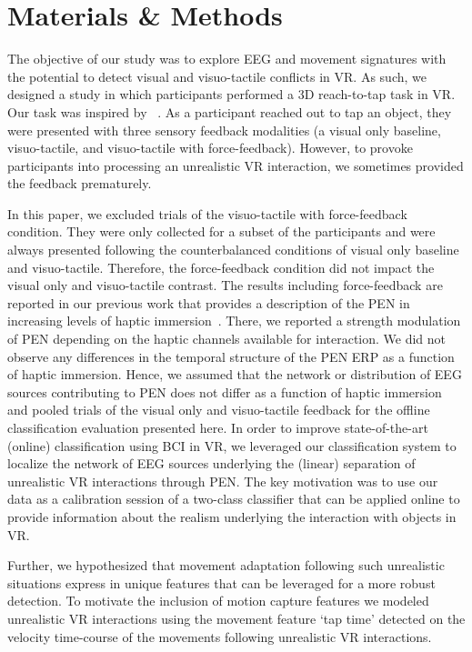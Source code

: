 \section{Materials \& Methods}
The objective of our study was to explore EEG and movement signatures with the potential to detect visual and visuo-tactile conflicts in VR. As such, we designed a study in which participants performed a 3D reach-to-tap task in VR. Our task was inspired by ~\cite{Singh2018-qi}. As a participant reached out to tap an object, they were presented with three sensory feedback modalities (a visual only baseline, visuo-tactile, and visuo-tactile with force-feedback). However, to provoke participants into processing an unrealistic VR interaction, we sometimes provided the feedback prematurely.

In this paper, we excluded trials of the visuo-tactile with force-feedback condition. They were only collected for a subset of the participants and were always presented following the counterbalanced conditions of visual only baseline and visuo-tactile. Therefore, the force-feedback condition did not impact the visual only and visuo-tactile contrast. The results including force-feedback are reported in our previous work that provides a description of the PEN in increasing levels of haptic immersion~\cite{Gehrke2019-og}. \textcolor{n}{There, we reported a strength modulation of PEN depending on the haptic channels available for interaction. We did not observe any differences in the temporal structure of the PEN ERP as a function of haptic immersion. Hence, we assumed that the network or distribution of EEG sources contributing to PEN does not differ as a function of haptic immersion and pooled trials of the visual only and visuo-tactile feedback for the offline classification evaluation presented here. In order to improve state-of-the-art (online) classification using BCI in VR, we leveraged our classification system to localize the network of EEG sources underlying the (linear) separation of unrealistic VR interactions through PEN. The key motivation was to use our data as a calibration session of a two-class classifier that can be applied online to provide information about the realism underlying the interaction with objects in VR.}

\textcolor{n}{Further, we hypothesized that movement adaptation following such unrealistic situations express in unique features that can be leveraged for a more robust detection. To motivate the inclusion of motion capture features we modeled unrealistic VR interactions using the movement feature `tap time' detected on the velocity time-course of the movements following unrealistic VR interactions.}

